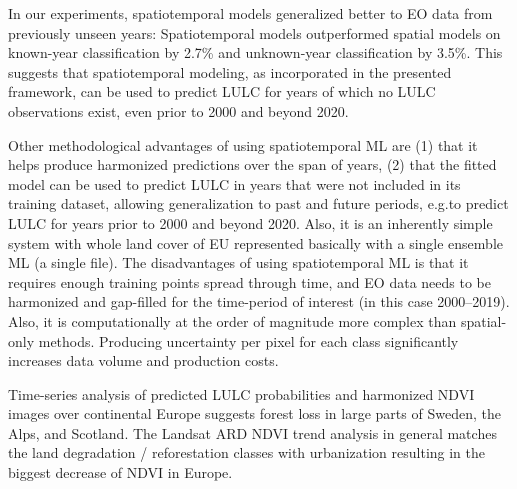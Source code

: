 In our experiments, spatiotemporal models generalized better to EO data from previously unseen years: Spatiotemporal models outperformed spatial models on known-year classification by 2.7\% and unknown-year classification by 3.5\%. This suggests that spatiotemporal modeling, as incorporated in the presented framework, can be used to predict LULC for years of which no LULC observations exist, even prior to 2000 and beyond 2020.

Other methodological advantages of using spatiotemporal ML are (1) that it helps produce harmonized predictions over the span of years, (2) that the fitted model can be used to predict LULC in years that were not included in its training dataset, allowing generalization to past and future periods, e.g.\@ to predict LULC for years prior to 2000 and beyond 2020. Also, it is an inherently simple system with whole land cover of EU represented basically with a single ensemble ML (a single file). The disadvantages of using spatiotemporal ML is that it requires enough training points spread through time, and EO data needs to be harmonized and gap-filled for the time-period of interest (in this case 2000--2019). Also, it is computationally at the order of magnitude more complex than spatial-only methods. Producing uncertainty per pixel for each class significantly increases data volume and production costs.

Time-series analysis of predicted LULC probabilities and harmonized NDVI images over continental Europe suggests forest loss in large parts of Sweden, the Alps, and Scotland. The Landsat ARD NDVI trend analysis in general matches the land degradation / reforestation classes with urbanization resulting in the biggest decrease of NDVI in Europe.